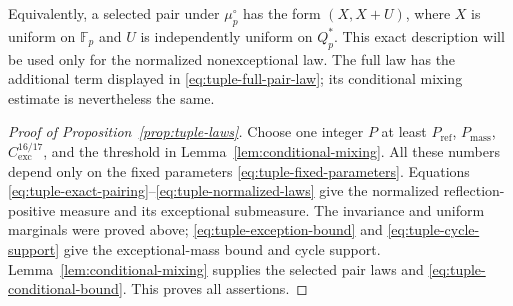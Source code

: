 Equivalently, a selected pair under \(\mu_p^\circ\) has the form
\((X,X+U)\), where \(X\) is uniform on \(\mathbb F_p\) and
\(U\) is independently uniform on \(Q_p^*\).  This exact description
will be used only for the normalized nonexceptional law.  The full
law has the additional term displayed in
\eqref{eq:tuple-full-pair-law}; its conditional mixing estimate is
nevertheless the same.


\begin{proof}[Proof of Proposition~\ref{prop:tuple-laws}]
Choose one integer \(P\) at least \(P_{\mathrm{ref}}\),
\(P_{\mathrm{mass}}\), \(C_{\mathrm{exc}}^{16/17}\), and the
threshold in Lemma~\ref{lem:conditional-mixing}.  All these numbers
depend only on the fixed parameters
\eqref{eq:tuple-fixed-parameters}.  Equations
\eqref{eq:tuple-exact-pairing}--\eqref{eq:tuple-normalized-laws}
give the normalized reflection-positive measure and its exceptional
submeasure.  The invariance and uniform marginals were proved above;
\eqref{eq:tuple-exception-bound} and \eqref{eq:tuple-cycle-support}
give the exceptional-mass bound and cycle support.
Lemma~\ref{lem:conditional-mixing} supplies the selected pair laws
and \eqref{eq:tuple-conditional-bound}.  This proves all assertions.
\end{proof}
